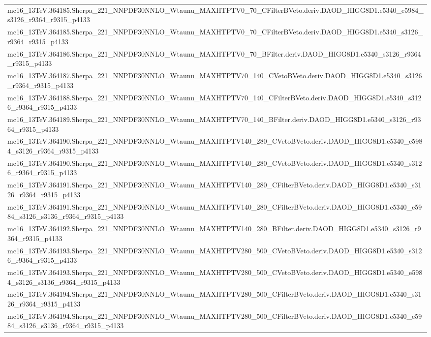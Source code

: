 \begin{adjustwidth}{-3em}{-3em}
\begin{longtable}{l}
mc16\_13TeV.364185.Sherpa\_221\_NNPDF30NNLO\_Wtaunu\_MAXHTPTV0\_70\_CFilterBVeto.deriv.DAOD\_HIGG8D1.e5340\_e5984\_s3126\_r9364\_r9315\_p4133 \\
mc16\_13TeV.364185.Sherpa\_221\_NNPDF30NNLO\_Wtaunu\_MAXHTPTV0\_70\_CFilterBVeto.deriv.DAOD\_HIGG8D1.e5340\_s3126\_r9364\_r9315\_p4133 \\
mc16\_13TeV.364186.Sherpa\_221\_NNPDF30NNLO\_Wtaunu\_MAXHTPTV0\_70\_BFilter.deriv.DAOD\_HIGG8D1.e5340\_s3126\_r9364\_r9315\_p4133 \\
mc16\_13TeV.364187.Sherpa\_221\_NNPDF30NNLO\_Wtaunu\_MAXHTPTV70\_140\_CVetoBVeto.deriv.DAOD\_HIGG8D1.e5340\_s3126\_r9364\_r9315\_p4133 \\
mc16\_13TeV.364188.Sherpa\_221\_NNPDF30NNLO\_Wtaunu\_MAXHTPTV70\_140\_CFilterBVeto.deriv.DAOD\_HIGG8D1.e5340\_s3126\_r9364\_r9315\_p4133 \\
mc16\_13TeV.364189.Sherpa\_221\_NNPDF30NNLO\_Wtaunu\_MAXHTPTV70\_140\_BFilter.deriv.DAOD\_HIGG8D1.e5340\_s3126\_r9364\_r9315\_p4133 \\
mc16\_13TeV.364190.Sherpa\_221\_NNPDF30NNLO\_Wtaunu\_MAXHTPTV140\_280\_CVetoBVeto.deriv.DAOD\_HIGG8D1.e5340\_e5984\_s3126\_r9364\_r9315\_p4133 \\
mc16\_13TeV.364190.Sherpa\_221\_NNPDF30NNLO\_Wtaunu\_MAXHTPTV140\_280\_CVetoBVeto.deriv.DAOD\_HIGG8D1.e5340\_s3126\_r9364\_r9315\_p4133 \\
mc16\_13TeV.364191.Sherpa\_221\_NNPDF30NNLO\_Wtaunu\_MAXHTPTV140\_280\_CFilterBVeto.deriv.DAOD\_HIGG8D1.e5340\_s3126\_r9364\_r9315\_p4133 \\
mc16\_13TeV.364191.Sherpa\_221\_NNPDF30NNLO\_Wtaunu\_MAXHTPTV140\_280\_CFilterBVeto.deriv.DAOD\_HIGG8D1.e5340\_e5984\_s3126\_s3136\_r9364\_r9315\_p4133 \\
mc16\_13TeV.364192.Sherpa\_221\_NNPDF30NNLO\_Wtaunu\_MAXHTPTV140\_280\_BFilter.deriv.DAOD\_HIGG8D1.e5340\_s3126\_r9364\_r9315\_p4133 \\
mc16\_13TeV.364193.Sherpa\_221\_NNPDF30NNLO\_Wtaunu\_MAXHTPTV280\_500\_CVetoBVeto.deriv.DAOD\_HIGG8D1.e5340\_s3126\_r9364\_r9315\_p4133 \\
mc16\_13TeV.364193.Sherpa\_221\_NNPDF30NNLO\_Wtaunu\_MAXHTPTV280\_500\_CVetoBVeto.deriv.DAOD\_HIGG8D1.e5340\_e5984\_s3126\_s3136\_r9364\_r9315\_p4133 \\
mc16\_13TeV.364194.Sherpa\_221\_NNPDF30NNLO\_Wtaunu\_MAXHTPTV280\_500\_CFilterBVeto.deriv.DAOD\_HIGG8D1.e5340\_s3126\_r9364\_r9315\_p4133 \\
mc16\_13TeV.364194.Sherpa\_221\_NNPDF30NNLO\_Wtaunu\_MAXHTPTV280\_500\_CFilterBVeto.deriv.DAOD\_HIGG8D1.e5340\_e5984\_s3126\_s3136\_r9364\_r9315\_p4133 \\

\end{longtable}
\end{adjustwidth}
